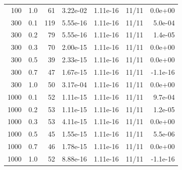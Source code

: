 {\begin{longtable}{rrrrrrr}
100 & 1.0 & 61 & 3.22e-02 & 1.11e-16 & 11/11 & 0.0e+00 \\
300 & 0.1 & 119 & 5.55e-16 & 1.11e-16 & 11/11 & 5.0e-04 \\
300 & 0.2 & 79 & 5.55e-16 & 1.11e-16 & 11/11 & 1.4e-05 \\
300 & 0.3 & 70 & 2.00e-15 & 1.11e-16 & 11/11 & 0.0e+00 \\
300 & 0.5 & 39 & 2.33e-15 & 1.11e-16 & 11/11 & 0.0e+00 \\
300 & 0.7 & 47 & 1.67e-15 & 1.11e-16 & 11/11 & -1.1e-16 \\
300 & 1.0 & 50 & 3.17e-04 & 1.11e-16 & 11/11 & 0.0e+00 \\
1000 & 0.1 & 52 & 1.11e-15 & 1.11e-16 & 11/11 & 9.7e-04 \\
1000 & 0.2 & 53 & 1.11e-15 & 1.11e-16 & 11/11 & 1.2e-05 \\
1000 & 0.3 & 53 & 4.11e-15 & 1.11e-16 & 11/11 & 0.0e+00 \\
1000 & 0.5 & 45 & 1.55e-15 & 1.11e-16 & 11/11 & 5.5e-06 \\
1000 & 0.7 & 46 & 1.78e-15 & 1.11e-16 & 11/11 & 0.0e+00 \\
1000 & 1.0 & 52 & 8.88e-16 & 1.11e-16 & 11/11 & -1.1e-16 \\
\bottomrule
\end{longtable}}

